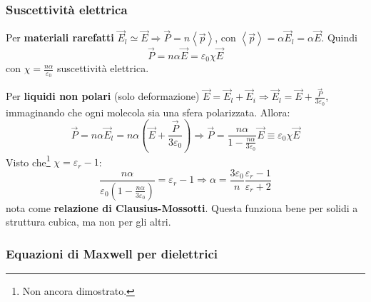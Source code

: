 \documentclass[a4paper]{scrartcl}
\numberwithin{equation}{subsection}
\theoremstyle{style1}
\begin{document}
\subsubsection{Suscettivit\`a elettrica}

Per \textbf{materiali rarefatti} $\vec{E}_l \simeq \vec{E}\Rightarrow \vec{P} = n \left\langle \vec{p} \right\rangle$, con $\left\langle \vec{p} \right\rangle= \alpha \vec{E}_l = \alpha \vec{E}$. Quindi
\begin{equation}
	\vec{P} =  n \alpha  \vec{E} = \varepsilon _0 \chi  \vec{E}
\end{equation}
con $\chi = \frac{n\alpha }{\varepsilon _0}$ suscettivit\`a elettrica.

Per \textbf{liquidi non polari} (solo deformazione) $\vec{E} = \vec{E}_l + \vec{E}_i\Rightarrow \vec{E}_l = \vec{E} + \frac{\vec{P}}{3\varepsilon _0}$, immaginando che ogni molecola sia una sfera polarizzata. Allora:
\begin{equation}
	\vec{P} = n\alpha \vec{E}_l = n \alpha  \left(\vec{E}+ \frac{\vec{P}}{3\varepsilon _0}\right) \Rightarrow \vec{P}= \frac{n\alpha }{1-\frac{n\alpha }{3\varepsilon _0}}\vec{E} \equiv \varepsilon _0 \chi \vec{E}
\end{equation}
Visto che\footnote{Non ancora dimostrato.} $\chi = \varepsilon _r -1$:
\begin{equation}
	\frac{n\alpha }{\varepsilon _0 \left(1- \frac{n\alpha }{3\varepsilon _0}\right) } = \varepsilon _r - 1 \Rightarrow \alpha = \frac{3\varepsilon _0}{n}\frac{\varepsilon _r-1}{\varepsilon _r+2}
\end{equation}
nota come \textbf{relazione di Clausius-Mossotti}. Questa funziona bene per solidi a struttura cubica, ma non per gli altri.
\subsubsection{Equazioni di Maxwell per dielettrici}
\end{document}
